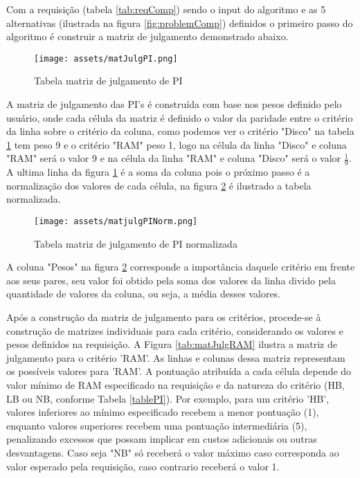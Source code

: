 \documentclass[12pt]{article}[abntex2]
\newcommand{\D}{\displaystyle}
\begin{document}
Com a requisição (tabela \ref{tab:reqComp}) sendo o input do algoritmo e as 5 alternativas (ilustrada na figura \ref{fig:problemComp}) definidos o primeiro passo do algoritmo é construir a matriz de julgamento demonstrado abaixo.

\begin{figure}[!ht]
\centering
\texttt{[image: assets/matJulgPI.png]}
\caption{Tabela matriz de julgamento de PI}
\label{tab:matJulgPI}
\end{figure}

A matriz de julgamento das PI's é construída com base nos pesos definido pelo usuário, onde cada célula da matriz é definido o valor da paridade entre o critério da linha sobre o critério da coluna, como podemos ver o critério "Disco" na tabela \ref{tab:matJulgPI} tem peso 9 e o critério "RAM" peso 1, logo na célula da linha "Disco" e coluna "RAM" será o valor 9 e na célula da linha "RAM" e coluna "Disco" será o valor $\D\frac{1}{9}$.
A ultima linha da figura \ref{tab:matJulgPI} é a soma da coluna pois o próximo passo é a normalização dos valores de cada célula, na figura \ref{fig:matJulgPINorm} é ilustrado a tabela normalizada.

\newpage
\begin{figure}[!ht]
\centering
\texttt{[image: assets/matjulgPINorm.png]}
\caption{Tabela matriz de julgamento de PI normalizada}
\label{fig:matJulgPINorm}
\end{figure}

A coluna "Pesos" na figura \ref{fig:matJulgPINorm} corresponde a importância daquele critério em frente aos seus pares, seu valor foi obtido pela soma dos valores da linha divido pela quantidade de valores da coluna, ou seja, a média desses valores.

Após a construção da matriz de julgamento para os critérios, procede-se à constru\-ção de matrizes individuais para cada critério, considerando os valores e pesos definidos na requisição. A Figura \ref{tab:matJulgRAM} ilustra a matriz de julgamento para o critério 'RAM'. As linhas e colunas dessa matriz representam os possíveis valores para 'RAM'. A pontuação atribuída a cada célula depende do valor mínimo de RAM especificado na requisição e da natureza do critério (HB, LB ou NB, conforme Tabela \ref{tablePI}). Por exemplo, para um critério 'HB', valores inferiores ao mínimo especificado recebem a menor pontuação (1), enquanto valores superiores recebem uma pontuação intermediária (5), penalizando excessos que possam implicar em custos adicionais ou outras desvantagens. Caso seja "NB" só receberá o valor máximo caso corresponda ao valor esperado pela requisição, caso contrario receberá o valor 1.
\end{document}

